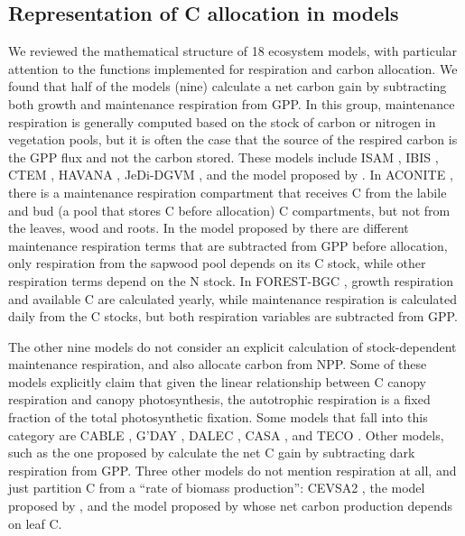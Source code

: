 \documentclass[bg, manuscript]{copernicus}
\begin{document}
\subsection{Representation of C allocation in models} 
We reviewed the mathematical structure of 18 ecosystem models, with particular attention to the functions implemented for respiration and carbon allocation. We found that half of the models (nine) calculate a net carbon gain by subtracting both growth and maintenance respiration from GPP. In this group, maintenance respiration is generally computed based on the stock of carbon or nitrogen in vegetation pools, but it is often the case that the source of the respired carbon is the GPP flux and not the carbon stored.
These models include ISAM \citep{ElMasri2013AgricForMeteorol}, IBIS \citep{Foley1996GBC}, CTEM \citep{Arora2005GCB}, HAVANA \citep{Haverd2016Biogeosciences}, JeDi-DGVM \citep{Pavlick2013Biogeosciences}, and  the model proposed by \citet{Trugman2018EcologyLetters}. 
In ACONITE \citep{Thomas2014GeosciModelDev}, there is a maintenance respiration compartment that receives C from the labile and bud (a pool that stores C before allocation) C compartments, but not from the leaves, wood and roots. In the model proposed by \citet{Murty2000EcolModel} there are different maintenance respiration terms that are subtracted from GPP before allocation, only respiration from the sapwood pool depends on its C stock, while other respiration terms depend on the N stock. In FOREST-BGC \citep{Running1988EcolModel}, growth respiration and available C are calculated yearly, while maintenance respiration is calculated daily from the C stocks, but both respiration variables are subtracted from GPP. 

The other nine models do not consider an explicit calculation of stock-dependent maintenance respiration, and also allocate carbon from NPP. Some of these models explicitly claim that given the linear relationship between C canopy respiration and canopy photosynthesis, the autotrophic respiration is a fixed fraction of the total photosynthetic fixation. Some models that fall into this category are 
CABLE \citep{Wang2010Biogeosciences}, G'DAY \citep{Comins1993EA}, DALEC \citep{Williams2005GCB}, CASA \citep{Potter1993GlobalBiogeochemCy}, and TECO \citep{Luo2012TE}. Other models, such as the one proposed by \citet{Hilbert1991AnnBot} calculate the net C gain by subtracting dark respiration from GPP. Three other models do not mention respiration at all, and just partition C from a ``rate of biomass production'': CEVSA2 \citep{Gu2010EcologicalComplexity}, the model proposed by \citet{King1993TreePhysiol}, and the model proposed by \citet{DeAngelis2012TheorEcol} whose net carbon production depends on leaf C. 
\end{document}
